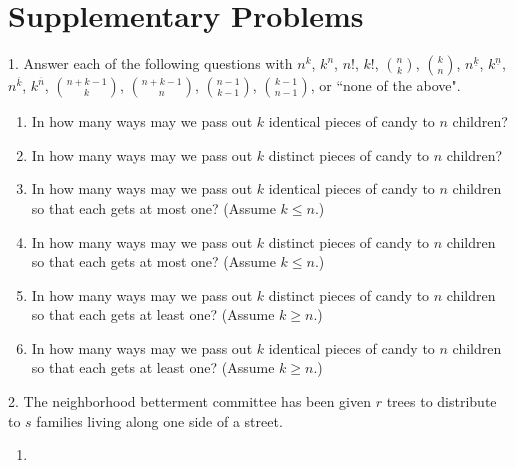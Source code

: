\documentclass[10pt,]{book}
\theoremstyle{plain}
\theoremstyle{definition}
\theoremstyle{definition}
\numberwithin{equation}{chapter}
\begin{document}
\section[{Supplementary Problems}]{Supplementary Problems}\label{sec_distribution-suppprobs}
\begin{exerciselist}
\item[1.]\marginsymbol[-1em]{} \hypertarget{exercise-23}{}\hypertarget{p-998}{}%
Answer each of the following questions with \(n^k\), \(k^n\), \(n!\), \(k!\), \(\binom{n}{k}\), \(\binom{k}{n}\), \(n^{\underline{k}}\), \(k^{\underline{n}}\), \(n^{\overline{k}}\), \(k^{\overline{n}}\), \(\binom{n+k-1}{k}\), \(\binom{n+k-1}{n}\), \(\binom{n-1}{k-1}\), \(\binom{k-1}{n-1}\), or ``none of the above". \leavevmode%
\begin{enumerate}[label=(\alph*)]
\item\hypertarget{li-41}{}\hypertarget{p-999}{}%
In how many ways may we pass out \(k\) identical pieces of candy to \(n\) children?%
\item\hypertarget{li-42}{}\hypertarget{p-1000}{}%
In how many ways may we pass out \(k\) distinct pieces of candy to \(n\) children?%
\item\hypertarget{li-43}{}\hypertarget{p-1001}{}%
In how many ways may we pass out \(k\) identical pieces of candy to \(n\) children so that each gets at most one?  (Assume \(k\le n\).)%
\item\hypertarget{li-44}{}\hypertarget{p-1002}{}%
In how many ways may we pass out \(k\) distinct pieces of candy to \(n\) children so that each gets at most one?  (Assume \(k\le n\).)%
\item\hypertarget{li-45}{}\hypertarget{p-1003}{}%
In how many ways may we pass out \(k\) distinct pieces of candy to \(n\) children so that each gets at least one?  (Assume \(k\ge n\).)%
\item\hypertarget{li-46}{}\hypertarget{p-1004}{}%
In how many ways may we pass out \(k\) identical pieces of candy to \(n\) children so that each gets at least one?  (Assume \(k\ge n\).)%
\end{enumerate}
%
\par\smallskip
\item[2.]\marginsymbol[-1em]{} \hypertarget{exercise-24}{}\hypertarget{p-1006}{}%
The neighborhood betterment committee has been given \(r\) trees to distribute to \(s\) families living along one side of a street. \leavevmode%
\begin{enumerate}[label=(\alph*)]
\item\hypertarget{li-53}{}\hypertarget{p-1007}{}%

\end{enumerate}
\end{exerciselist}
\end{document}
